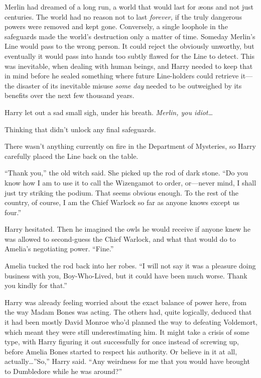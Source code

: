 Merlin had dreamed of a long run, a world that would last for æons and not just centuries. The world had no reason not to last \emph{forever,} if the truly dangerous powers were removed and kept gone. Conversely, a single loophole in the safeguards made the world’s destruction only a matter of time. Someday Merlin’s Line would pass to the wrong person. It could reject the obviously unworthy, but eventually it would pass into hands too subtly flawed for the Line to detect. This was inevitable, when dealing with human beings, and Harry needed to keep that in mind before he sealed something where future Line-holders could retrieve it—the disaster of its inevitable misuse \emph{some day} needed to be outweighed by its benefits over the next few thousand years.

Harry let out a sad small sigh, under his breath. \emph{Merlin, you idiot…}

Thinking that didn’t unlock any final safeguards.

There wasn’t anything currently on fire in the Department of Mysteries, so Harry carefully placed the Line back on the table.

“Thank you,” the old witch said. She picked up the rod of dark stone. “Do you know how I am to use it to call the Wizengamot to order, or—never mind, I shall just try striking the podium. That seems obvious enough. To the rest of the country, of course, I am the Chief Warlock so far as anyone knows except us four.”

Harry hesitated. Then he imagined the owls he would receive if anyone knew he was allowed to second-guess the Chief Warlock, and what that would do to Amelia’s negotiating power. “Fine.”

Amelia tucked the rod back into her robes. “I will not say it was a pleasure doing business with you, Boy-Who-Lived, but it could have been much worse. Thank you kindly for that.”

Harry was already feeling worried about the exact balance of power here, from the way Madam Bones was acting. The others had, quite logically, deduced that it had been mostly David Monroe who’d planned the way to defeating Voldemort, which meant they were still underestimating him. It might take a crisis of some type, with Harry figuring it out successfully for once instead of screwing up, before Amelia Bones started to respect his authority. Or believe in it at all, actually…”So,” Harry said. “Any weirdness for me that you would have brought to Dumbledore while he was around?”


